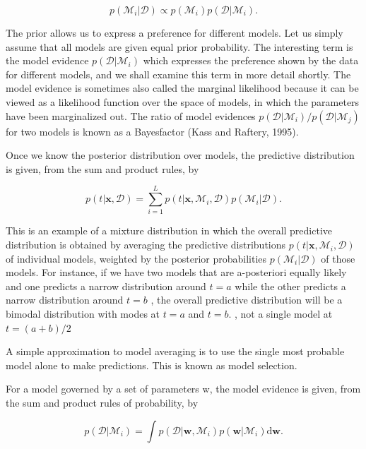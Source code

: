 \documentclass[
  10
]{article}
\begin{document}
\[
p (\mathcal {M} _ {i} | \mathcal {D}) \propto p (\mathcal {M} _ {i}) p (\mathcal {D} | \mathcal {M} _ {i}).\tag{3.66}
\]

The prior allows us to express a preference for different models. Let us
simply assume that all models are given equal prior probability. The
interesting term is the model evidence
\(p ( \mathcal { D } | \mathcal { M } _ { i } )\) which expresses the
preference shown by the data for different models, and we shall examine
this term in more detail shortly. The model evidence is sometimes also
called the marginal likelihood because it can be viewed as a likelihood
function over the space of models, in which the parameters have been
marginalized out. The ratio of model evidences
\(p ( \mathcal { D } | \mathcal { M } _ { i } ) / p ( \mathcal { D } | \mathcal { M } _ { j } )\)
for two models is known as a Bayesfactor (Kass and Raftery, 1995).

Once we know the posterior distribution over models, the predictive
distribution is given, from the sum and product rules, by

\[
p (t | \mathbf {x}, \mathcal {D}) = \sum_ {i = 1} ^ {L} p (t | \mathbf {x}, \mathcal {M} _ {i}, \mathcal {D}) p (\mathcal {M} _ {i} | \mathcal {D}).\tag{3.67}
\]

This is an example of a mixture distribution in which the overall
predictive distribution is obtained by averaging the predictive
distributions
\(p ( t | \mathbf { x } , \mathcal { M } _ { i } , \mathcal { D } )\) of
individual models, weighted by the posterior probabilities
\(p ( \mathcal { M } _ { i } | \mathcal { D } )\) of those models. For
instance, if we have two models that are a-posteriori equally likely and
one predicts a narrow distribution around \(t = a\) while the other
predicts a narrow distribution around \(t = b\) , the overall predictive
distribution will be a bimodal distribution with modes at \(t = a\) and
\(t = b .\) , not a single model at \(t = ( a + b ) / 2\)

A simple approximation to model averaging is to use the single most
probable model alone to make predictions. This is known as model
selection.

For a model governed by a set of parameters w, the model evidence is
given, from the sum and product rules of probability, by

\[
p (\mathcal {D} | \mathcal {M} _ {i}) = \int p (\mathcal {D} | \mathbf {w}, \mathcal {M} _ {i}) p (\mathbf {w} | \mathcal {M} _ {i}) \mathrm{d} \mathbf {w}.\tag{3.68}
\]
\end{document}
